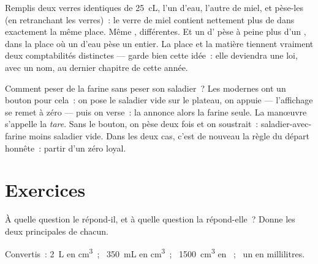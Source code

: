 \begin{example}\label{ex:g6:mass-and-volume:different}
Remplis deux verres identiques de \qty{25}{cL}, l'un d'eau, l'autre
de miel, et pèse-les (en retranchant les verres)~: le verre de miel
contient nettement plus de  dans exactement la même place.
Même ,  différentes. Et un  d' pèse à peine plus
d'un , dans la place où un  d'eau pèse un 
entier. La place et la matière tiennent vraiment deux comptabilités
distinctes --- garde bien cette idée~: elle deviendra une loi, avec un
nom, au dernier chapitre de cette année.
\end{example}

\begin{remark}\label{rem:g6:mass-and-volume:tare}
Comment peser de la farine sans peser son saladier~? Les 
modernes ont un bouton pour cela~: on pose le saladier vide sur le
plateau, on appuie --- l'affichage se remet à zéro --- puis on verse~:
la  annonce alors la farine seule. La manœuvre s'appelle la
\emph{tare}. Sans le bouton, on pèse deux fois et on soustrait~:
saladier-avec-farine moins saladier vide. Dans les deux cas, c'est de
nouveau la règle du départ honnête~: partir d'un zéro loyal.
\end{remark}

\section{Exercices}

\begin{exercise}[$\star$]\label{exo:g6:mass-and-volume:1}
À quelle question le  répond-il, et à quelle question la 
répond-elle~? Donne les deux principales  de chacun.
\end{exercise}

\begin{exercise}[$\star$]\label{exo:g6:mass-and-volume:2}
Convertis~: \qty{2}{L} en \unit{cm^3}~; \ \qty{350}{mL} en
\unit{cm^3}~; \ \qty{1500}{cm^3} en ~; \ un  en
millilitres.
\end{exercise}

